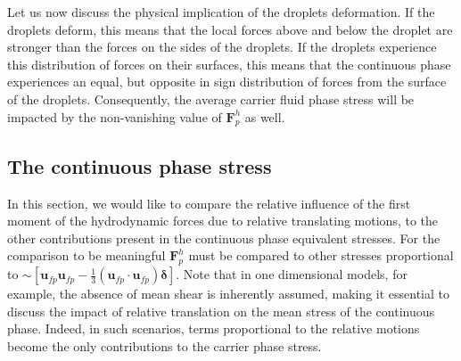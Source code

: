 Let us now discuss the physical implication of the droplets deformation. 
If the droplets deform, this means that the local forces above and below the droplet are stronger than the forces on the sides of the droplets. 
If the droplets experience this distribution of forces on their surfaces, this means that the continuous phase experiences an equal, but opposite in sign distribution of forces from the surface of the droplets. 
Consequently, the average carrier fluid phase stress will be impacted by the non-vanishing value of $\textbf{F}^h_p$ as well. 

\subsection{The continuous phase stress}

In this section, we would like to compare the relative influence of the first moment of the hydrodynamic forces due to relative translating motions, to the other contributions present in the continuous phase equivalent stresses. 
For the comparison to be meaningful $\textbf{F}^h_p$ must be compared to other stresses proportional to $\sim [\textbf{u}_{fp}\textbf{u}_{fp}-\frac{1}{3}(\textbf{u}_{fp}\cdot\textbf{u}_{fp})\bm\delta]$. 
Note that in one dimensional models, for example, the absence of mean shear is inherently assumed, making it essential to discuss the impact of relative translation on the mean stress of the continuous phase. 
Indeed, in such scenarios, terms proportional to the relative motions become the only contributions to the carrier phase stress. 

